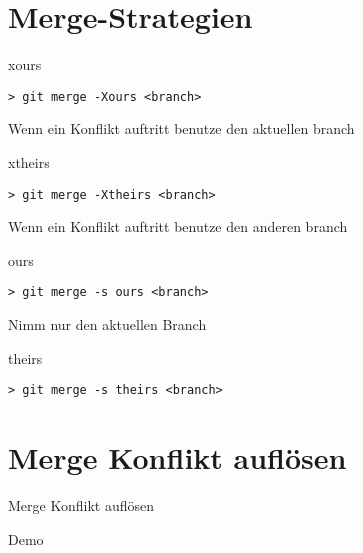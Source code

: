 \documentclass[presentation, smaller]{beamer}
\begin{document}
\section{Merge-Strategien}
\label{sec:org88178dc}
\begin{frame}[fragile,label={sec:org16d3ac9}]{xours}
 \begin{verbatim}
> git merge -Xours <branch>
\end{verbatim}
Wenn ein Konflikt auftritt benutze den aktuellen branch
\end{frame}
\begin{frame}[fragile,label={sec:orgc5d6a56}]{xtheirs}
 \begin{verbatim}
> git merge -Xtheirs <branch>
\end{verbatim}
Wenn ein Konflikt auftritt benutze den anderen branch
\end{frame}
\begin{frame}[fragile,label={sec:orgeb4559f}]{ours}
 \begin{verbatim}
> git merge -s ours <branch>
\end{verbatim}
Nimm nur den aktuellen Branch
\end{frame}
\begin{frame}[fragile,label={sec:org05a193d}]{theirs}
 \begin{verbatim}
> git merge -s theirs <branch>
\end{verbatim}
\end{frame}
\section{Merge Konflikt auflösen}
\label{sec:orgb1f2c5b}
\begin{frame}[label={sec:org9a6f046}]{Merge Konflikt auflösen}
\begin{center}
Demo
\end{center}
\end{frame}
\end{document}
